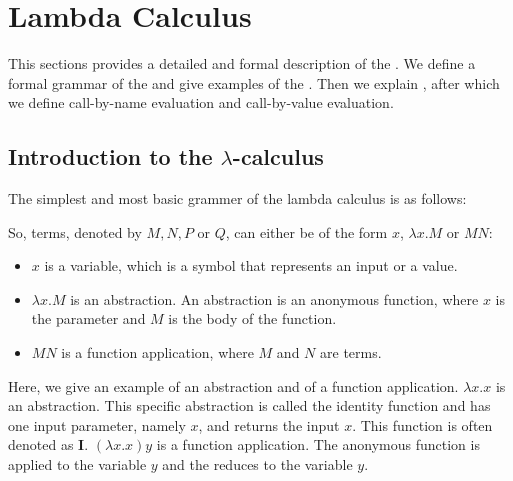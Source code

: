 \chapter{Lambda Calculus}
This sections provides a detailed and formal description of the \lc. We define a formal grammar of the \lc and give examples of the \lc.
Then we explain \br, after which we define call-by-name evaluation and call-by-value evaluation.


\section{\texorpdfstring{Introduction to the \boldmath$\lambda$-calculus}{Introduction to the Lambda Calculus}}
The simplest and most basic grammer of the lambda calculus is as follows:

\vspace{10pt}
\begin{grammar}{
	}
\end{grammar}

\vspace{10pt}
So, terms, denoted by $M, N, P$ or $Q$, can either be of the form $x$, $\lambda x.M$ or $M N$:
\begin{itemize}[noitemsep]
	\item $x$ is a variable, which is a symbol that represents an input or a value.
	\item $\lambda x.M$ is an abstraction. An abstraction is an anonymous function, where $x$ is the parameter and $M$ is the body of the function.
	\item $M N$ is a function application, where $M$ and $N$ are terms.
\end{itemize}

Here, we give an example of an abstraction and of a function application. $\lambda x. x$ is an abstraction. This specific abstraction is called the identity function and has one input parameter, namely $x$, and returns the input $x$.
This function is often denoted as $\mathbf{I}$. $(\lambda x. x) y$ is a function application. The anonymous function is applied to the variable $y$ and the \lterm reduces to the variable $y$.

